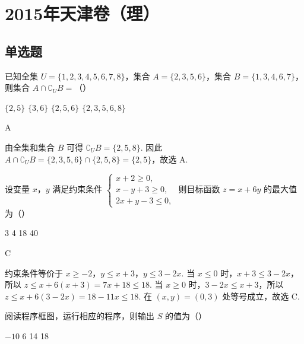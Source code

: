 \chapter{2015年天津卷（理）}

\section{单选题}

\begin{problem}
已知全集 \(U = \{1, 2, 3, 4, 5, 6, 7, 8\}\)，集合 \(A = \{2, 3, 5, 6\}\)，集合 \(B = \{1, 3, 4, 6, 7\}\)，则集合 \(A \cap \complement_U B =\)（\quad）

\choices
    {\(\{2,5\}\)}
    {\(\{3,6\}\)}
    {\(\{2,5,6\}\)}
    {\(\{2,3,5,6,8\}\)}
\end{problem}

\begin{answer}
A
\end{answer}

\begin{solution}
由全集和集合 \(B\) 可得 \(\complement_U B=\{2,5,8\}\). 因此 \(A\cap\complement_U B=\{2,3,5,6\}\cap\{2,5,8\}=\{2,5\}\)，故选 A.
\end{solution}

\begin{problem}
设变量 \(x\)，\(y\) 满足约束条件 \(\begin{cases}
x + 2 \geqslant 0,\\
x - y + 3 \geqslant 0,\\
2x + y - 3 \leqslant 0,
\end{cases}\) 则目标函数 \(z = x + 6y\) 的最大值为（\quad）

\choices
    {3}
    {4}
    {18}
    {40}
\end{problem}

\begin{answer}
C
\end{answer}

\begin{solution}
约束条件等价于 \(x\geqslant-2\)，\(y\leqslant x+3\)，\(y\leqslant3-2x\). 当 \(x\leqslant0\) 时，\(x+3\leqslant3-2x\)，所以 \(z\leqslant x+6(x+3)=7x+18\leqslant18\). 当 \(x\geqslant0\) 时，\(3-2x\leqslant x+3\)，所以 \(z\leqslant x+6(3-2x)=18-11x\leqslant18\). 在 \((x,y)=(0,3)\) 处等号成立，故选 C.
\end{solution}

\begin{problem}
阅读程序框图，运行相应的程序，则输出 \(S\) 的值为（\quad）


\choices
    {\(-10\)}
    {6}
    {14}
    {18}
\end{problem}

